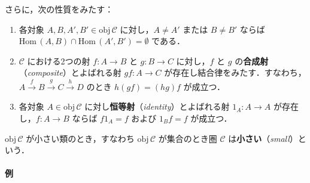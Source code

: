 \documentclass[b5paper,pandoc]{bxjsarticle}
\providecommand{\tightlist}{%
  \setlength{\itemsep}{0pt}\setlength{\parskip}{0pt}}
\let\oldparagraph\paragraph
\renewcommand{\paragraph}[1]{\oldparagraph{#1}\mbox{}}
\begin{document}
さらに，次の性質をみたす：

\begin{enumerate}
\def\labelenumi{\arabic{enumi})}
\tightlist
\item
  各対象 \(A, B, A', B' \in \mathrm{obj}\,\mathscr C\)
  に対し，\(A \neq A'\) または \(B \neq B'\) ならば
  \(\mathrm{Hom}\,(A, B) \cap \mathrm{Hom}\,(A', B') = \emptyset\)
  である．
\item
  \(\mathscr C\) における2つの射 \(f \colon A \to B\) と
  \(g \colon B \to C\) に対し，\(f\) と \(g\)
  の\textbf{合成射}（\emph{composite}）とよばれる射
  \(gf \colon A \to C\)
  が存在し結合律をみたす．すなわち，\(A \xrightarrow f B \xrightarrow g C \xrightarrow h D\)
  のとき \(h(gf) = (hg)f\) が成立つ．
\item
  各対象 \(A \in \mathrm{obj}\,\mathscr C\)
  に対し\textbf{恒等射}（\emph{identity}）とよばれる射
  \(1_A \colon A \to A\) が存在し，\(f \colon A \to B\) ならば
  \(f1_A = f\) および \(1_ B f = f\) が成立つ．
\end{enumerate}

\(\mathrm{obj}\,\mathscr C\) が小さい類のとき，すなわち
\(\mathrm{obj}\,\mathscr C\) が集合のとき圏 \(\mathscr C\)
は\textbf{小さい}（\emph{small}）という．

\hypertarget{ux4f8b}{%
\paragraph{例}\label{ux4f8b}}
\end{document}

